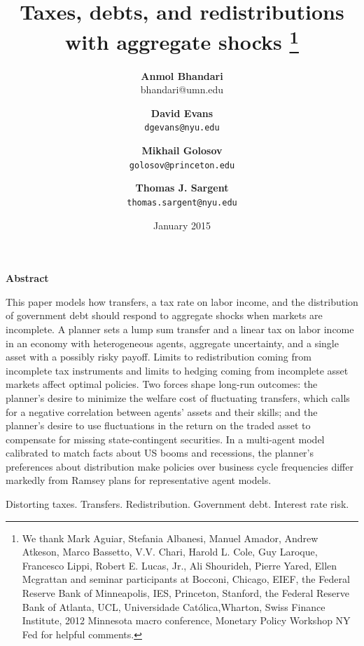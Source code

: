 \documentclass[thmsb,11pt]{article}
\begin{document}
\author{\textbf{Anmol Bhandari}\\bhandari@umn.edu \and \textbf{David Evans} \\ \texttt{dgevans@nyu.edu} \and \textbf{Mikhail Golosov}\\\texttt{golosov@princeton.edu} \and \textbf{Thomas J. Sargent} \\ \texttt{thomas.sargent@nyu.edu}
}
\title{\textbf{Taxes, debts,  and redistributions with aggregate shocks%
\thanks{%
We thank Mark Aguiar, Stefania Albanesi, Manuel Amador,  Andrew Atkeson, Marco Bassetto, V.V. Chari, Harold
L. Cole, Guy Laroque, Francesco Lippi, Robert E. Lucas, Jr., Ali Shourideh, Pierre Yared, Ellen Mcgrattan and seminar
participants at Bocconi, Chicago, EIEF, the Federal Reserve Bank of
Minneapolis, IES, Princeton, Stanford, the Federal Reserve Bank of Atlanta, UCL, Universidade Cat\'{o}lica,Wharton, Swiss Finance Institute, 2012
Minnesota macro conference, Monetary Policy Workshop NY Fed for helpful
comments.}}}
\date{January 2015}
\maketitle
\begin{center}
\textbf{Abstract}
\end{center}

This paper models how transfers, a tax rate on labor income, and  the distribution of government debt should
respond to aggregate shocks when markets are incomplete. A planner sets a lump sum transfer and a linear tax on labor income
in an economy with heterogeneous agents, aggregate uncertainty, and a single asset with a possibly risky payoff. Limits 
to redistribution coming from incomplete  tax instruments and limits to hedging coming from incomplete  asset markets affect optimal policies.
Two forces shape long-run outcomes: the planner's desire to minimize the welfare cost of fluctuating transfers, which calls for a negative
correlation between
agents' assets and their skills; and the planner's desire to use fluctuations in
the return on the traded asset to compensate for missing state-contingent securities.  In a multi-agent model calibrated to match facts about 
US booms and recessions,
the planner's preferences about distribution  make  policies over business cycle frequencies  differ markedly from
Ramsey plans for representative agent  models.

\medskip


\bigskip
{}Distorting taxes. Transfers. Redistribution.  Government debt.  Interest rate risk.
\end{document}
